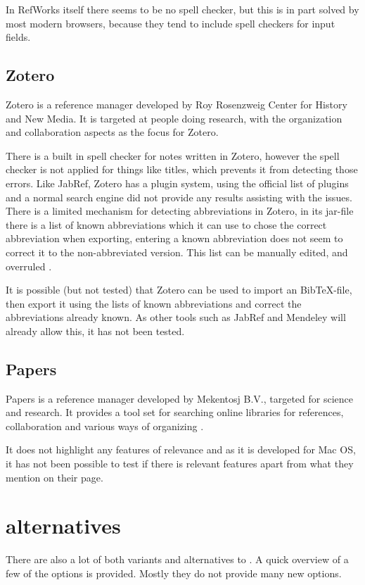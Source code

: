 In RefWorks itself there seems to be no spell checker, but this is in
part solved by most modern browsers, because they tend to include
spell checkers for input fields.


\subsection{Zotero}
Zotero is a reference manager developed by Roy Rosenzweig Center for
History and New Media.  It is targeted at people doing research, with
the organization and collaboration aspects as the focus for
Zotero\cite{zotero_features}.

There is a built in spell checker for notes written in Zotero, however
the spell checker is not applied for things like titles, which
prevents it from detecting those errors.  Like JabRef, Zotero has a
plugin system, using the official list of plugins
\cite{zotero_plugins} and a normal search engine did not provide any
results assisting with the issues. There is a limited mechanism for
detecting abbreviations in Zotero, in its jar-file there is a list of
known abbreviations which it can use to chose the correct abbreviation
when exporting, entering a known abbreviation does not seem to correct
it to the non-abbreviated version.  This list can be manually edited,
and overruled \cite{zotero_abbreviations}.

It is possible (but not tested) that Zotero can be used to import an
Bib{\TeX}-file, then export it using the lists of known abbreviations
and correct the abbreviations already known.  As other tools such as
JabRef and Mendeley will already allow this, it has not been tested.


\subsection{Papers}
Papers is a reference manager developed by Mekentosj B.V., targeted
for science and research.  It provides a tool set for searching online
libraries for references, collaboration and various ways of
organizing \cite{papers_features}.

It does not highlight any features of relevance \cite{papers_features}
and as it is developed for Mac OS, it has not been possible to test if
there is relevant features apart from what they mention on their page.


\section{{\bibtex} alternatives}
There are also a lot of both variants and alternatives to {\bibtex}.
A quick overview of a few of the options is provided.  Mostly they do
not provide many new options.

